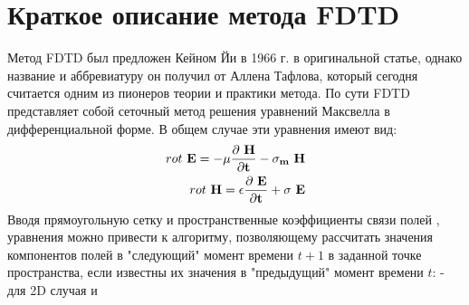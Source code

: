 \documentclass[10pt]{article}
\begin{document}
\section{Краткое описание метода FDTD}
\label{fdtd_basics}
Метод FDTD был предложен Кейном Йи в 1966 г. в оригинальной статье\cite{Yee1966},
однако название и аббревиатуру он получил от Аллена Тафлова, который сегодня 
считается одним из пионеров теории и практики метода\cite{Taflove}. По сути
FDTD представляет собой сеточный метод решения уравнений Максвелла в 
дифференциальной форме. В общем случае эти уравнения имеют вид:
\begin{eqnarray}
rot~\bf E = -\mu\frac{\partial~\bf H}{\partial t} - \sigma_m~\bf H\\
rot~\bf H = \epsilon\frac{\partial~\bf E}{\partial t} + \sigma~\bf E
\end{eqnarray}
Вводя прямоугольную сетку и пространственные коэффициенты связи полей
\cite{udfdtd}, уравнения можно привести к алгоритму, позволяющему рассчитать
значения компонентов полей в "следующий" момент времени $t+1$ в заданной
точке пространства, если известны их значения в "предыдущий" момент времени $t$:
- для 2D случая и
\end{document}
